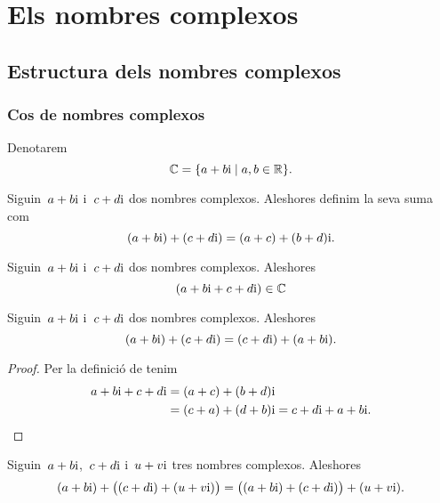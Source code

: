 \documentclass[../analisi-complexa.tex]{subfiles}
\begin{document}
\chapter{Els nombres complexos}
\section{Estructura dels nombres complexos}
    \subsection{Cos de nombres complexos}
    \begin{notation}
        \label{notation:cos-de-nombres-complexos}
        Denotarem
        \[
            \mathbb{C} = \{a+b\mathrm{i}\mid a,b\in\mathbb{R}\}.
        \]
    \end{notation}
    \begin{definition}
        \label{def:suma-de-nombres-complexos}
        Siguin~\(a+b\mathrm{i}\) i~\(c+d\mathrm{i}\) dos nombres complexos.
        Aleshores definim la seva suma com
        \[
            (a+b\mathrm{i})+(c+d\mathrm{i}) = (a+c)+(b+d)\mathrm{i}.
        \]
    \end{definition}
    \begin{observation}
        \label{obs:els-nombres-complexos-estan-tancats-per-la-suma}
        Siguin~\(a+b\mathrm{i}\) i~\(c+d\mathrm{i}\) dos nombres complexos.
        Aleshores
        \[
            (a+b\mathrm{i}+c+d\mathrm{i})\in\mathbb{C}
        \]
    \end{observation}
    \begin{proposition}
        \label{prop:els-nombres-complexos-commuten-per-la-suma}
        Siguin~\(a+b\mathrm{i}\) i~\(c+d\mathrm{i}\) dos nombres complexos.
        Aleshores
        \[
            (a+b\mathrm{i})+(c+d\mathrm{i}) = (c+d\mathrm{i})+(a+b\mathrm{i}).
        \]
    \end{proposition}
    \begin{proof}
        Per la definició de  tenim
        \begin{align*}
            a+b\mathrm{i}+c+d\mathrm{i} &= (a+c)+(b+d)\mathrm{i} \\
             &= (c+a)+(d+b)\mathrm{i} = c+d\mathrm{i}+a+b\mathrm{i}.\qedhere
        \end{align*}
    \end{proof}
    \begin{proposition}
        \label{prop:els-nombres-complexos-son-associatius-per-la-suma}
        Siguin~\(a+b\mathrm{i}\),~\(c+d\mathrm{i}\) i~\(u+v\mathrm{i}\) tres nombres complexos.
        Aleshores
        \[
            (a+b\mathrm{i})+\big((c+d\mathrm{i})+(u+v\mathrm{i})\big)
            = \big((a+b\mathrm{i})+(c+d\mathrm{i})\big)+(u+v\mathrm{i}).
        \]
    \end{proposition}
\end{document}
